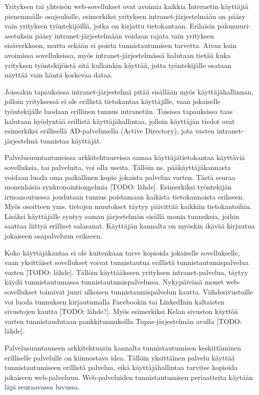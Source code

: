 Yrityksen tai yhteisön web-sovellukset ovat avoimia kaikkia Internetin käyttäjiä pienemmälle osajoukolle, esimerkiksi yrityksen intranet-järjestelmään on pääsy vain yrityksen työntekijöillä, jotka on kirjattu tietokantaan. Erilaisin palomuuri-asetuksin pääsy intranet-järjestelmään voidaan rajata vain yrityksen sisäverkkoon, mutta sekään ei poista tunnistautumisen tarvetta. Aivan kuin avoimissa sovelluksissa, myös intranet-järjestelmässä halutaan tietää kuka yrityksen työntekijöistä sitä kulloinkin käyttää, jotta työntekijälle osataan näyttää vain häntä koskevaa dataa.

Joissakin tapauksissa intranet-järjestelmä pitää sisällään myös käyttäjähallinnan, jolloin yrityksessä ei ole erillistä tietokantaa käyttäjille, vaan jokaiselle työntekijälle luodaan erillinen tunnus intranetiin. Toisissa tapauksissa taas halutaan hyödyntää erillistä käyttäjähallintaa, jolloin käyttäjän tiedot ovat  esimerkiksi erillisellä AD-palvelimella (Active Directory), jota vasten intranet-järjestelmä tunnistaa käyttäjät.

Palvelusuuntautuneissa arkkitehtuureissa samaa käyttäjätietokantaa käyttäviä sovelluksia, tai palveluita, voi olla useita. Tällöin ns. pääkäyttäjäkannasta voidaan luoda oma paikallinen kopio jokaista palvelua varten. Tästä seuraa monenlaisia synkronointiongelmia [TODO: lähde]. Esimerkiksi työntekijän irtisanoutuessa joudutaan tunnus poistamaan kaikista tietokannoista erikseen. Myös osoitteen yms. tietojen muutokset täytyy päivittää kaikkiin tietokantoihin. Lisäksi käyttäjälle syntyy saman järjestelmän sisällä monia tunnuksia, joihin saattaa liittyä erilliset salasanat. Käyttäjän kannalta on myöskin ikävää kirjautua jokaiseen osapalveluun erikseen.

Koko käyttäjäkantaa ei ole kuitenkaan tarve kopioida jokaiselle sovellukselle, vaan yksittäiset sovellukset voivat tunnistautua erillistä tunnistautumispalvelua vasten [TODO: lähde]. Tällöin käyttääkseen yrityksen intranet-palvelua, täytyy käydä tunnistautumassa tunnistautumispalvelussa. Nykypäivänä monet web-sovellukset toimivat juuri ulkoisen tunnistaumispalvelun kautta. Viihdesivustoille voi luoda tunnuksen kirjautumalla Facebookin tai LinkedInin kaltaisten sivustojen kautta [TODO: lähde?]. Myös esimerkiksi Kelan sivuston käyttöä varten tunnistaudutaan pankkitunnuksilla Tupas-järjestelmän avulla [TODO: lähde].

Palvelusuuntauneen arkkitehtuurin kannalta tunnistautumisen keskittäminen erilliselle palvelulle on kiinnostava idea. Tällöin yksittäinen palvelu käyttää tunnistautumiseen erillistä palvelua, eikä käyttäjähallintaa tarvitse kopioida jokaiseen web-palveluun. Web-palveluiden tunnistautumisen periaatteita käytään läpi seuraavassa luvussa.